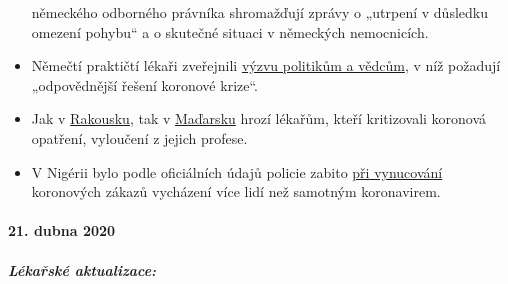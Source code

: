 \begin{itemize}
  německého odborného právníka shromažďují zprávy o „utrpení v důsledku
  omezení pohybu`` a o skutečné situaci v německých nemocnicích.
\item
  Němečtí praktičtí lékaři zveřejnili
  \href{https://aerzteinnenvorort.de/der-appell}{výzvu politikům a
  vědcům}, v níž požadují „odpovědnější řešení koronové krize``.
\item
  Jak v
  \href{https://www.wochenblick.at/corona-kritik-aerztekammer-droht-unbotmaessigem-arzt-mit-ausschluss/}{Rakousku},
  tak v
  \href{https://magyarhang.org/belfold/2020/04/16/etikai-vizsgalat-indul-az-orvos-ellen-aki-szerint-nincs-jarvany-es-az-idosek-csak-a-felelemtol-halnak-meg/}{Maďarsku}
  hrozí lékařům, kteří kritizovali koronová opatření, vyloučení z jejich
  profese.
\item
  V Nigérii bylo podle oficiálních údajů policie zabito
  \href{https://www.bbc.com/news/world-africa-52317196}{při vynucování}
  koronových zákazů vycházení více lidí než samotným koronavirem.
\end{itemize}

\hypertarget{21-dubna-2020}{%
\paragraph{21. dubna 2020}\label{21-dubna-2020}}

\hypertarget{luxe9kaux159skuxe9-aktualizace-1}{%
\subparagraph{\texorpdfstring{\textbf{Lékařské
aktualizace:}}{Lékařské aktualizace:}}\label{luxe9kaux159skuxe9-aktualizace-1}}

